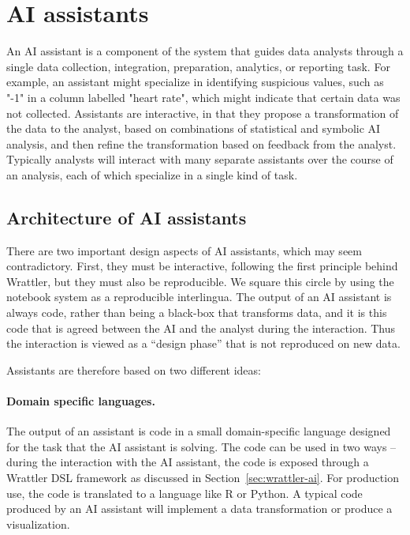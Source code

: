 \documentclass[sigplan,preprint,10pt]{acmart}\settopmatter{printfolios=true,printccs=false,printacmref=false}
\theoremstyle{plain}
\theoremstyle{definition}
\begin{document}
\section{AI assistants}
\label{sec:ai}

{
An AI assistant is a component
of the system that 
guides data analysts through a single data collection, integration, preparation, 
analytics, or reporting task.
For example, an assistant might
specialize in identifying suspicious
values, such as "-1" in a column labelled
"heart rate", which might indicate
that certain data was not collected.
Assistants are interactive, in that
they propose a transformation
of the data to the analyst, based on combinations
of statistical and symbolic AI analysis,
and then refine the transformation
based on feedback from the analyst.
Typically analysts will interact with many separate assistants over 
the course of an analysis, each of which specialize in a single kind of task.
}
\subsection{Architecture of AI assistants}

There are two important design aspects of AI assistants, which may seem 
contradictory.
 First, they must be interactive, following
 the first principle behind Wrattler, but
 they must also be reproducible.
We square this circle by using the notebook
system as a reproducible interlingua. 
The output of an AI assistant is always code, rather
than being a black-box that transforms data,
and it is this code that is agreed between the AI and the analyst during the interaction.
Thus the interaction is viewed as a ``design phase''
that is not reproduced on new data.

Assistants are therefore based on two different ideas:

\paragraph{Domain specific languages.}
The output of an assistant is code in a small domain-specific language designed for the task that
the AI assistant is solving. The code can be used in two ways -- during the interaction with the
AI assistant, the code is exposed through a Wrattler DSL framework as discussed in 
Section~\ref{sec:wrattler-ai}. For production use, the code is translated to a language like R or 
Python. A typical code produced by an AI assistant will implement a data transformation or
produce a visualization.
\end{document}
